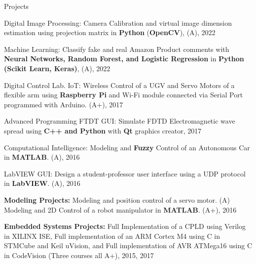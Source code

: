 \begin{cventries}
  \cventry
    {} %
    {Projects} %
    {} %
    {} %
    {
      \begin{cvitems} %
        \item{Digital Image Processing: Camera Calibration and virtual image dimension estimation using projection matrix in \textbf{Python} (\textbf{OpenCV}), (A), 2022}
            \item{Machine Learning: Classify fake and real Amazon Product comments with \textbf{Neural Networks, Random Forest, and Logistic Regression} in \textbf{Python} \textbf{(Scikit Learn, Keras)}, (A), 2022}
            \item{Digital Control Lab. IoT: Wireless Control of a UGV and Servo Motors of a flexible arm using \textbf{Raspberry Pi} and Wi-Fi module connected via Serial Port programmed with Arduino. (A+), 2017}
            \item{Advanced Programming FTDT GUI: Simulate FDTD Electromagnetic wave spread using \textbf{C++ and Python} with \textbf{Qt} graphics creator, 2017}
            \item{Computational Intelligence: Modeling and \textbf{Fuzzy} Control of an Autonomous Car in \textbf{MATLAB}. (A), 2016}
            \item{LabVIEW GUI: Design a student-professor user interface using a UDP protocol in \textbf{LabVIEW}. (A), 2016}
            \item{\textbf{Modeling Projects:} Modeling and position control of a servo motor. (A)\\ Modeling and 2D Control of a robot manipulator in \textbf{MATLAB}. (A+), 2016}
            \item{\textbf{Embedded Systems Projects:} Full Implementation of a CPLD using Verilog in XILINX ISE, Full implementation of an ARM Cortex M4 using C in STMCube and Keil uVision, and Full implementation of  AVR ATMega16 using C in CodeVision (Three courses all A+), 2015, 2017}
      \end{cvitems}
    }
    

\end{cventries}
